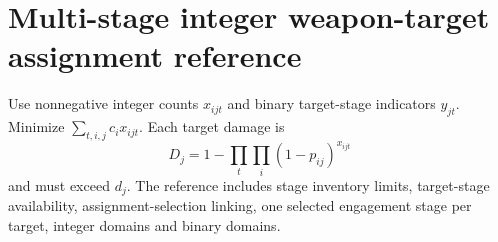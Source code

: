 \section*{Multi-stage integer weapon-target assignment reference}
Use nonnegative integer counts \(x_{ijt}\) and binary target-stage indicators \(y_{jt}\). Minimize \(\sum_{t,i,j} c_i x_{ijt}\). Each target damage is
\[
D_j = 1-\prod_t\prod_i (1-p_{ij})^{x_{ijt}}
\]
and must exceed \(d_j\). The reference includes stage inventory limits, target-stage availability, assignment-selection linking, one selected engagement stage per target, integer domains and binary domains.
